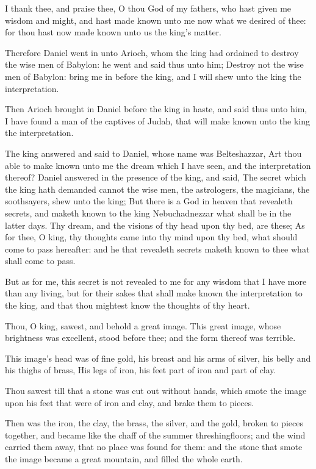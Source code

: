 \Verse I thank thee, and praise thee, O thou God of my fathers, who hast given me wisdom and might, and hast made known unto me now what we desired of thee: for thou hast now made known unto us the king's matter.

\Verse Therefore Daniel went in unto Arioch, whom the king had ordained to destroy the wise men of Babylon: he went and said thus unto him; Destroy not the wise men of Babylon: bring me in before the king, and I will shew unto the king the interpretation.

\Verse Then Arioch brought in Daniel before the king in haste, and said thus unto him, I have found a man of the captives of Judah, that will make known unto the king the interpretation.

\Verse The king answered and said to Daniel, whose name was Belteshazzar, Art thou able to make known unto me the dream which I have seen, and the interpretation thereof?  \Verse Daniel answered in the presence of the king, and said, The secret which the king hath demanded cannot the wise men, the astrologers, the magicians, the soothsayers, shew unto the king; \Verse But there is a God in heaven that revealeth secrets, and maketh known to the king Nebuchadnezzar what shall be in the latter days. Thy dream, and the visions of thy head upon thy bed, are these; \Verse As for thee, O king, thy thoughts came into thy mind upon thy bed, what should come to pass hereafter: and he that revealeth secrets maketh known to thee what shall come to pass.

\Verse But as for me, this secret is not revealed to me for any wisdom that I have more than any living, but for their sakes that shall make known the interpretation to the king, and that thou mightest know the thoughts of thy heart.

\Verse Thou, O king, sawest, and behold a great image. This great image, whose brightness was excellent, stood before thee; and the form thereof was terrible.

\Verse This image's head was of fine gold, his breast and his arms of silver, his belly and his thighs of brass, \Verse His legs of iron, his feet part of iron and part of clay.

\Verse Thou sawest till that a stone was cut out without hands, which smote the image upon his feet that were of iron and clay, and brake them to pieces.

\Verse Then was the iron, the clay, the brass, the silver, and the gold, broken to pieces together, and became like the chaff of the summer threshingfloors; and the wind carried them away, that no place was found for them: and the stone that smote the image became a great mountain, and filled the whole earth.

